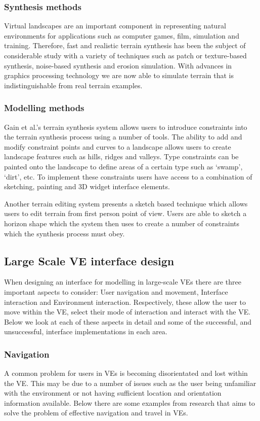 \documentclass{sig-alternate-05-2015}
\begin{document}
\subsubsection{Synthesis methods}
Virtual landscapes are an important component in representing natural environments for applications such as computer games, film, simulation and training\cite{Gain2015}. Therefore, fast and realistic terrain synthesis has been the subject of considerable study with a variety of techniques such as patch or texture-based synthesis\cite{Cruz2015, Tasse2012}, noise-based synthesis\cite{Musgrave1989} and erosion simulation\cite{Anh2007}. With advances in graphics processing technology we are now able to simulate terrain that is indistinguishable from real terrain examples\cite{Gain2015}. 
\subsubsection{Modelling methods}
Gain et al.'s terrain synthesis system allows users to introduce constraints into the terrain synthesis process using a number of tools\cite{Gain2015}. The ability to add and modify constraint points and curves to a landscape allows users to create landscape features such as hills, ridges and valleys. Type constraints can be painted onto the landscape to define areas of a certain type such as `swamp', `dirt', etc. To implement these constraints users have access to a combination of sketching, painting and 3D widget interface elements. 

Another terrain editing system presents a sketch based technique which allows users to  edit terrain from first person point of view\cite{Tasse2014}. Users are able to sketch a horizon shape which the system then uses to create a number of constraints which the synthesis process must obey.
\subsection{Large Scale VE interface design}
When designing an interface for modelling in large-scale VEs there are three important aspects to consider: User navigation and movement, Interface interaction and Environment interaction\cite{Bowman2001}. Respectively, these allow the user to move within the VE, select their mode of interaction and interact with the VE. Below we look at each of these aspects in detail and some of the successful, and unsuccessful, interface implementations in each area.
\subsubsection{Navigation}
A common problem for users in VEs is becoming disorientated and lost within the VE\cite{Darken1993}. This may be due to a number of issues such as the user being unfamiliar with the environment or not having sufficient location and orientation information available. Below there are some examples from research that aims to solve the problem of effective navigation and travel in VEs.
\end{document}
